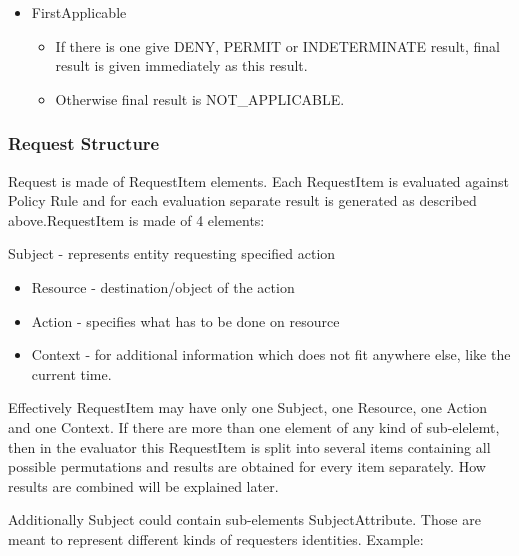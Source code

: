 \documentclass[a4paper]{article}
\newcommand\liststyleWWviiiNumxvii{%
\renewcommand\labelitemi{o}
\renewcommand\labelitemii{o}
\renewcommand\labelitemiii{[F0A7?]}
\renewcommand\labelitemiv{[F0B7?]}
}
\newcommand\liststyleWWviiiNumxix{%
\renewcommand\theenumi{\arabic{enumi}}
\renewcommand\theenumii{\arabic{enumii}}
\renewcommand\theenumiii{\arabic{enumiii}}
\renewcommand\labelitemi{o}
\renewcommand\labelenumi{\theenumi.}
\renewcommand\labelenumii{\theenumii.}
\renewcommand\labelenumiii{\theenumiii.}
}
\begin{document}
\liststyleWWviiiNumxvii
\begin{itemize}
\item {\color{black}
FirstApplicable}

\begin{itemize}
\item {\color{black}
If there is one give DENY, PERMIT or INDETERMINATE result, final result
is given immediately as this result.}
\item {\color{black}
Otherwise final result is NOT\_APPLICABLE.}
\end{itemize}
\end{itemize}
\subsubsection{Request Structure}
{\color{black}
Request is made of RequestItem elements. Each RequestItem is evaluated
against Policy Rule and for each evaluation separate result is
generated as described above.RequestItem is made of 4 elements:}

{\color{black}
Subject - represents entity requesting specified action}

\liststyleWWviiiNumxix
\begin{itemize}
\item {\color{black}
Resource - destination/object of the action}
\item {\color{black}
Action - specifies what has to be done on resource}
\item {\color{black}
Context - for additional information which does not fit anywhere else,
like the current time.}
\end{itemize}
{\color{black}
Effectively RequestItem may have only one Subject, one Resource, one
Action and one Context. If there are more than one element of any kind
of sub-elelemt, then in the evaluator this RequestItem is split into
several items containing all possible permutations and results are
obtained for every item separately. How results are combined will be
explained later.}

{\color{black}
Additionally Subject could contain sub-elements SubjectAttribute. Those
are meant to represent different kinds of requesters{\textquotesingle}
identities. Example:}
\end{document}
